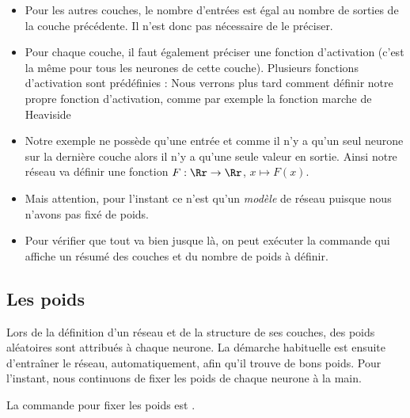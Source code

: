 \documentclass[11pt,class=report,crop=false]{standalone}
\begin{document}
\begin{itemize}

  \item Pour les autres couches, le nombre d'entrées est égal au nombre de sorties de la couche précédente. Il n'est donc pas nécessaire de le préciser.
  
  \item Pour chaque couche, il faut également préciser une fonction d'activation (c'est la même pour tous les neurones de cette couche). Plusieurs fonctions d'activation sont prédéfinies :
  Nous verrons plus tard comment définir notre propre fonction d'activation, comme par exemple la fonction marche de Heaviside
  
  \item Notre exemple ne possède qu'une entrée et comme il n'y a qu'un seul neurone sur la dernière couche alors il n'y a qu'une seule valeur en sortie. Ainsi notre réseau va définir une fonction $F : \Rr \to \Rr$, $x \mapsto F(x)$.
  
  \item Mais attention, pour l'instant ce n'est qu'un \emph{modèle} de réseau puisque nous n'avons pas fixé de poids. 


  
  \item Pour vérifier que tout va bien jusque là, on peut exécuter la commande 
  qui affiche un résumé des couches et du nombre de poids à définir.
  
\end{itemize}


\subsection{Les poids}

Lors de la définition d'un réseau et de la structure de ses couches, des poids aléatoires sont attribués à chaque neurone. 
La démarche habituelle est ensuite d'entraîner le réseau, automatiquement, afin qu'il trouve de \og{}bons\fg{} poids. Pour l'instant, nous continuons de fixer les poids de chaque neurone à la main. 

La commande pour fixer les poids est . 
\end{document}
